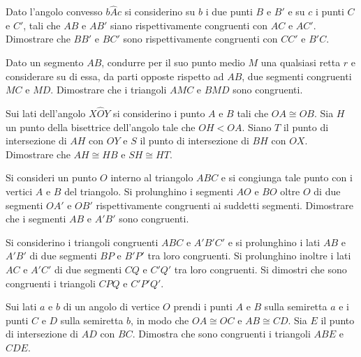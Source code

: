 \begin{multicols}{2}
\begin{esercizio}
\label{ese:2.18}
Dato l'angolo convesso \(b\widehat{A}c\) si considerino su \(b\) i due 
punti \(B\) e \(B'\) e su \(c\) i punti \(C\) e \(C'\), tali che \(AB\) e \(AB'\) 
siano rispettivamente congruenti con \(AC\) e \(AC'\). Dimostrare che 
\(BB'\) e \(BC'\) sono rispettivamente congruenti con \(CC'\) e \(B'C\).
\end{esercizio}

\begin{esercizio}
\label{ese:2.19}
Dato un segmento \(AB\), condurre per il suo punto medio \(M\) una 
qualsiasi retta \(r\) e considerare su di essa, da parti opposte 
rispetto ad \(AB\), due segmenti congruenti \(MC\) e \(MD\). Dimostrare che 
i triangoli \(AMC\) e \(BMD\) sono congruenti.
\end{esercizio}

\begin{esercizio}
\label{ese:2.20}
Sui lati dell'angolo \(X\widehat{O}Y\) si considerino i punto \(A\) e \(B\) 
tali che \(OA\cong OB\). Sia \(H\) un punto della bisettrice dell'angolo 
tale che \(OH<OA\). Siano \(T\) il punto di intersezione di \(AH\) con \(OY\) 
e \(S\) il punto di intersezione di \(BH\) con \(OX\). Dimostrare che 
\(AH\cong HB\) e \(SH\cong HT\).
\end{esercizio}

\begin{esercizio}
\label{ese:2.21}
Si consideri un punto \(O\) interno al triangolo \(ABC\) e si congiunga 
tale punto con i vertici \(A\) e \(B\) del triangolo. Si prolunghino i 
segmenti \(AO\) e \(BO\) oltre \(O\) di due segmenti \(OA'\) e \(OB'\) 
rispettivamente congruenti ai suddetti segmenti. Dimostrare che i 
segmenti \(AB\) e \(A'B'\) sono congruenti.
\end{esercizio}

\begin{esercizio}
\label{ese:2.22}
Si considerino i triangoli congruenti \(ABC\) e \(A'B'C'\) e si 
prolunghino i lati \(AB\) e \(A'B'\) di due segmenti \(BP\) e \(B'P'\) tra 
loro congruenti. Si prolunghino inoltre i lati \(AC\) e \(A'C'\) di due 
segmenti \(CQ\) e \(C'Q'\) tra loro congruenti. Si dimostri che sono 
congruenti i triangoli \(CPQ\) e \(C'P'Q'\).
\end{esercizio}

\begin{esercizio}
\label{ese:2.23}
Sui lati \(a\) e \(b\) di un angolo di vertice \(O\) prendi i punti \(A\) e 
\(B\) sulla semiretta \(a\) e i punti \(C\) e \(D\) sulla semiretta \(b\), in 
modo che \(OA\cong OC\) e \(AB\cong CD\). Sia \(E\) il punto di 
intersezione di \(AD\) con \(BC\). Dimostra che sono congruenti i 
triangoli \(ABE\) e \(CDE\).
\end{esercizio}


\end{multicols}
